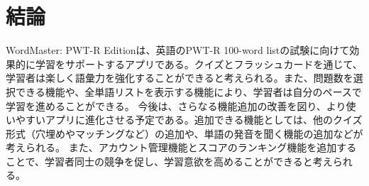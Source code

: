 \documentclass[]{jsarticle}
\begin{document}
\newpage
\section{結論}

WordMaster: PWT-R Editionは、英語のPWT-R 100-word listの試験に向けて効果的に学習をサポートするアプリである。クイズとフラッシュカードを通じて、学習者は楽しく語彙力を強化することができると考えられる。また、問題数を選択できる機能や、全単語リストを表示する機能により、学習者は自分のペースで学習を進めることができる。
今後は、さらなる機能追加の改善を図り、より使いやすいアプリに進化させる予定である。追加できる機能としては、他のクイズ形式（穴埋めやマッチングなど）の追加や、単語の発音を聞く機能の追加などが考えられる。
また、アカウント管理機能とスコアのランキング機能を追加することで、学習者同士の競争を促し、学習意欲を高めることができると考えられる。
\end{document}
